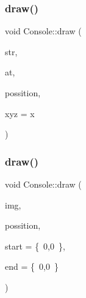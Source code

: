\mbox{\label{classsc_1_1_console_a855cdd56ef1b7bc0117ae79f926fb4fd}} 
\subsubsection{\texorpdfstring{draw()}{draw()}\hspace{0.1cm}{\footnotesize\ttfamily [6/8]}}
{\footnotesize\ttfamily void Console\+::draw (\begin{DoxyParamCaption}\item[{const std\+::wstring \&}]{str,  }\item[{W\+O\+RD}]{at,  }\item[{\mbox{\hyperlink{classsc_1_1_vector2_d}{Vector2D}}}]{possition,  }\item[{char}]{xyz = {\ttfamily \textquotesingle{}x\textquotesingle{}} }\end{DoxyParamCaption})}

\mbox{\label{classsc_1_1_console_a2cf4ab527564da95b6867db3e7cd0b45}} 
\subsubsection{\texorpdfstring{draw()}{draw()}\hspace{0.1cm}{\footnotesize\ttfamily [7/8]}}
{\footnotesize\ttfamily void Console\+::draw (\begin{DoxyParamCaption}\item[{const \mbox{\hyperlink{classsc_1_1_bit_a}{BitA}}$<$ \mbox{\hyperlink{classsc_1_1_w_mark}{W\+Mark}} $>$ \&}]{img,  }\item[{\mbox{\hyperlink{classsc_1_1_vector2_d}{Vector2D}}}]{possition,  }\item[{\mbox{\hyperlink{classsc_1_1_vector2_d}{Vector2D}}}]{start = {\ttfamily \{~0,0~\}},  }\item[{\mbox{\hyperlink{classsc_1_1_vector2_d}{Vector2D}}}]{end = {\ttfamily \{~0,0~\}} }\end{DoxyParamCaption})}

\mbox{\label{classsc_1_1_console_a7d0da8266093966f6c7e632bd5f6ccb8}} 
